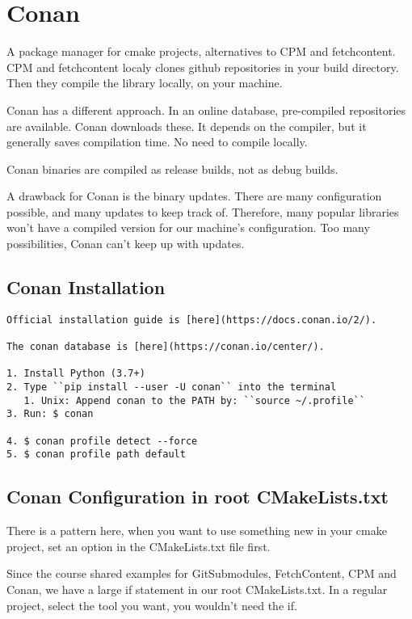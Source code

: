 \documentclass[openany]{report}
\begin{document}
\section{Conan}

A package manager for cmake projects, alternatives to CPM and fetchcontent. CPM and fetchcontent localy
clones github repositories in your build directory. Then they compile the library locally, on your machine. 


Conan has a different approach. In an online database, pre-compiled repositories are available.
Conan downloads these. It depends on the compiler, but it generally saves compilation time.
No need to compile locally.

Conan binaries are compiled as release builds, not as debug builds.

A drawback for Conan is the binary updates. There are many configuration possible, and many updates
to keep track of. Therefore, many popular libraries won't have a compiled version for our machine's
configuration. Too many possibilities, Conan can't keep up with updates.

\subsection{Conan Installation}

\begin{verbatim}
Official installation guide is [here](https://docs.conan.io/2/).

The conan database is [here](https://conan.io/center/).

1. Install Python (3.7+)
2. Type ``pip install --user -U conan`` into the terminal
   1. Unix: Append conan to the PATH by: ``source ~/.profile``
3. Run: $ conan

4. $ conan profile detect --force
5. $ conan profile path default
\end{verbatim}


\subsection{Conan Configuration in root CMakeLists.txt}

There is a pattern here, when you want to use something new in your cmake project,
set an option in the CMakeLists.txt file first.

Since the course shared examples for GitSubmodules, FetchContent, CPM and Conan,
we have a large if statement in our root CMakeLists.txt. In a regular project, 
select the tool you want, you wouldn't need the if.
\end{document}
